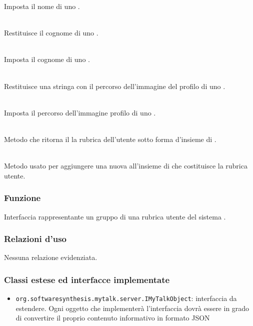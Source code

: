 \begin{description}
	Imposta il nome di uno .
	\item{}\\
	Restituisce il cognome di uno .
	\item{}\\
	Imposta il cognome di uno .
	\item{}\\
	Restituisce una stringa con il percorso dell'immagine del profilo di uno .
	\item{}\\
	Imposta il percorso dell'immagine profilo di uno .
	\item{}\\
	Metodo che ritorna il la rubrica dell'utente sotto forma d'insieme di .
	\item{}\\
	Metodo usato per aggiungere una nuova  all'insieme di  che costituisce la rubrica utente.
\end{description}


\subsubsection*{Funzione}
Interfaccia rappresentante un gruppo di una rubrica utente del sistema \caName.

\subsubsection*{Relazioni d'uso}

Nessuna relazione evidenziata.

\subsubsection*{Classi estese ed interfacce implementate}
\begin{itemize}
		\item \texttt{org.softwaresynthesis.mytalk.server.IMyTalkObject}: interfaccia da estendere. Ogni oggetto che implementerà l'interfaccia  dovrà essere in grado di convertire il proprio contenuto informativo in formato JSON
\end{itemize}

